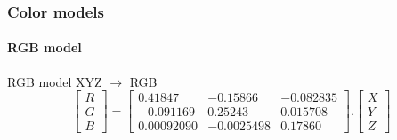 \documentclass{beamer}
\begin{document}
\begin{frame}
\frametitle{Color models}
\framesubtitle{RGB model}
\begin{block}{RGB model}
\footnotesize{XYZ $\rightarrow$ RGB}
\[
\begin{bmatrix}
R\\G\\B
\end{bmatrix} = 
\begin{bmatrix}
0.41847 & -0.15866 & - 0.082835\\
-0.091169 & 0.25243 & 0.015708 \\
0.00092090 & - 0.0025498 & 0.17860 
\end{bmatrix} 
.
\begin{bmatrix}
X\\Y\\Z
\end{bmatrix}
\]
\end{block}
\end{frame}
\end{document}
